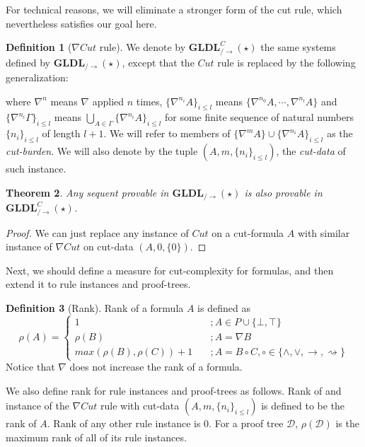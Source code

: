 \documentclass[12pt,a4paper]{article}
\theoremstyle{plain}
\newtheorem{thm}{Theorem}[section]
\theoremstyle{definition}
\newtheorem{dfn}[thm]{Definition}
\begin{document}
For technical reasons, we will eliminate a stronger form of the cut rule, which nevertheless satisfies our goal here.
\begin{dfn}[$\nabla Cut$ rule]\label{def:n-cut} We denote by $\mathbf{GLDL}^C_{/\rightarrow}(\star)$ the same systems defined by $\mathbf{GLDL}_{/\rightarrow}(\star)$, except that the $Cut$ rule is replaced by the following generalization:
\begin{prooftree}
\end{prooftree}
where $\nabla^n$ means $\nabla$ applied $n$ times, $\{\nabla^{n_i} A\}_{i \leq l}$ means $\{\nabla^{n_0} A,\dotsb, \nabla^{n_l} A\}$ and $\{\nabla^{n_i} \Gamma\}_{i \leq l}$ means $\bigcup_{A \in \Gamma} \{\nabla^{n_i} A\}_{i \leq l}$ for some finite sequence of natural numbers $\{n_i\}_{i \leq l}$ of length $l+1$.
We will refer to members of $\{\nabla^m A\} \cup \{\nabla^{n_i} A\}_{i \leq l}$ as the \emph{cut-burden}. We will also denote by the tuple $(A, m, \{n_i\}_{i \leq l})$, the \emph{cut-data} of such instance.
\end{dfn}

\begin{thm}\label{cor:mc-riddance} Any sequent provable in $\mathbf{GLDL}_{/\rightarrow}(\star)$ is also provable in $\mathbf{GLDL}^C_{/\rightarrow}(\star)$.
\end{thm}
\begin{proof}
	We can just replace any instance of $Cut$ on a cut-formula $A$ with similar instance of $\nabla Cut$ on cut-data $(A, 0, \{0\})$.
\end{proof}

Next, we should define a measure for cut-complexity for formulas, and then extend it to rule instances and proof-trees.

\begin{dfn}[Rank]
	Rank of a formula $A$ is defined as
	\[ \rho(A) = \begin{cases}
	1 & \quad ; A \in P \cup \{ \bot, \top \} \\
	\rho(B) & \quad ; A = \nabla B \\
	max(\rho(B), \rho(C)) + 1 & \quad ; A = B \circ C, \circ \in \{ \land, \lor, \rightarrow, \rightsquigarrow \}
	\end{cases} \]
	Notice that $\nabla$ does not increase the rank of a formula.
	
	We also define rank for rule instances and proof-trees as follows. Rank of and instance of the $\nabla Cut$ rule with cut-data $(A, m, \{n_i\}_{i \leq l})$ is defined to be the rank of $A$. Rank of any other rule instance is $0$.
	For a proof tree $\mathcal{D}$, $\rho(\mathcal{D})$ is the maximum rank of all of its rule instances.
\end{dfn}
\end{document}
